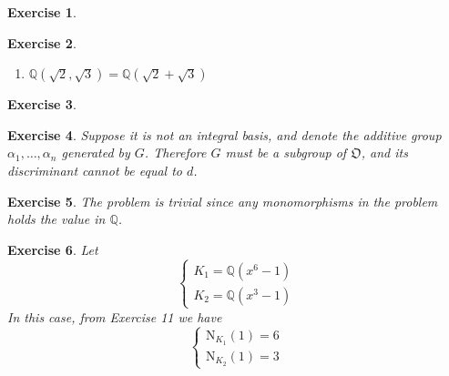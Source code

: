 \documentclass{article}
\theoremstyle{breakstyle}
\newtheorem{exercise}{Exercise}[section]
\begin{document}
\begin{exercise}
\end{exercise}

\begin{exercise}
    \leavevmode \vspace{-\baselineskip}
    \begin{enumerate}[label=\alph*)]
        \item $\mathbb{Q}(\sqrt{2}, \sqrt{3}) = \mathbb{Q}(\sqrt{2} + \sqrt{3})$
    \end{enumerate}
\end{exercise}

\begin{exercise}
\end{exercise}

\begin{exercise}
    Suppose it is not an integral basis, and denote the additive group $\alpha_1, \ldots, \alpha_n$ generated by $G$. Therefore $G$ must be a subgroup of $\mathfrak{O}$, and its discriminant cannot be equal to $d$.
\end{exercise}

\begin{exercise}
    The problem is trivial since any monomorphisms in the problem holds the value in $\mathbb{Q}$.
\end{exercise}

\begin{exercise}
    Let
    \[ 
        \begin{cases}
            K_1 = \mathbb{Q}(x^6 - 1) \\
            K_2 = \mathbb{Q}(x^3 - 1)
        \end{cases} 
    \]
    In this case, from \emph{Exercise 11} we have
    \[ 
        \begin{cases}
            \mathrm{N}_{K_1}(1) = 6 \\
            \mathrm{N}_{K_2}(1) = 3
        \end{cases} 
    \]
\end{exercise}
\end{document}
